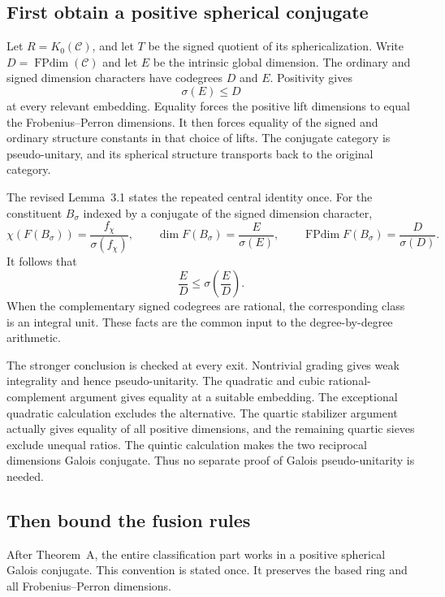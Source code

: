 \documentclass[11pt,a4paper]{article}
\newcommand{\FPdim}{\operatorname{FPdim}}
\newcommand{\issue}[1]{\subsection{#1}}
\begin{document}
\issue{First obtain a positive spherical conjugate}

Let \(R=K_0(\mathcal C)\), and let \(T\) be the signed quotient of its
sphericalization. Write \(D=\FPdim(\mathcal C)\) and let \(E\) be the
intrinsic global dimension. The ordinary and signed dimension characters
have codegrees \(D\) and \(E\). Positivity gives
\[
 \sigma(E)\le D
\]
at every relevant embedding. Equality forces the positive lift dimensions
to equal the Frobenius--Perron dimensions. It then forces equality of the
signed and ordinary structure constants in that choice of lifts.
The conjugate category is pseudo-unitary, and its spherical structure
transports back to the original category.

The revised Lemma~3.1 states the repeated central identity once. For the
constituent \(B_\sigma\) indexed by a conjugate of the signed dimension
character,
\[
 \chi(F(B_\sigma))=\frac{f_\chi}{\sigma(f_\chi)},\qquad
 \dim F(B_\sigma)=\frac{E}{\sigma(E)},\qquad
 \FPdim F(B_\sigma)=\frac{D}{\sigma(D)}.
\]
It follows that
\[
 \frac ED\le \sigma\!\left(\frac ED\right).
\]
When the complementary signed codegrees are rational, the corresponding
class is an integral unit. These facts are the common input to the
degree-by-degree arithmetic.

The stronger conclusion is checked at every exit. Nontrivial grading gives
weak integrality and hence pseudo-unitarity. The quadratic and cubic
rational-complement argument gives equality at a suitable embedding.
The exceptional quadratic calculation excludes the alternative.
The quartic stabilizer argument actually gives equality of all positive
dimensions, and the remaining quartic sieves exclude unequal ratios.
The quintic calculation makes the two reciprocal dimensions Galois
conjugate. Thus no separate proof of Galois pseudo-unitarity is needed.

\issue{Then bound the fusion rules}

After Theorem~A, the entire classification part works in a positive
spherical Galois conjugate. This convention is stated once. It preserves
the based ring and all Frobenius--Perron dimensions.
\end{document}
